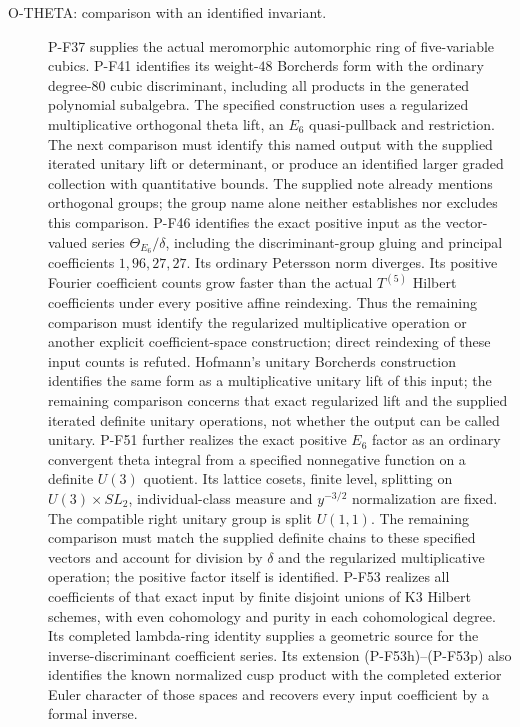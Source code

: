 \documentclass[11pt,a4paper]{article}
\begin{document}
\begin{description}
\item[O-THETA: comparison with an identified invariant.]
P-F37 supplies the actual meromorphic automorphic ring of
five-variable cubics. P-F41 identifies its weight-$48$
Borcherds form with the ordinary degree-$80$ cubic discriminant,
including all products in the generated polynomial subalgebra.
The specified construction uses a regularized multiplicative
orthogonal theta lift, an $E_6$ quasi-pullback and restriction.
The next comparison must identify this named output with the
supplied iterated unitary lift or determinant, or produce an
identified larger graded collection with quantitative bounds.
The supplied note already mentions orthogonal groups; the group
name alone neither establishes nor excludes this comparison.
P-F46 identifies the exact positive input as the vector-valued
series $\Theta_{E_6}/\delta$, including the discriminant-group
gluing and principal coefficients $1,96,27,27$. Its ordinary
Petersson norm diverges. Its positive Fourier coefficient counts
grow faster than the actual $T^{(5)}$ Hilbert coefficients under
every positive affine reindexing. Thus the remaining comparison
must identify the regularized multiplicative operation or another
explicit coefficient-space construction; direct reindexing of
these input counts is refuted. Hofmann's unitary Borcherds
construction identifies the same form as a multiplicative
unitary lift of this input; the remaining comparison concerns
that exact regularized lift and the supplied iterated definite
unitary operations, not whether the output can be called unitary.
P-F51 further realizes the exact positive $E_6$ factor as an
ordinary convergent theta integral from a specified nonnegative
function on a definite $U(3)$ quotient. Its lattice cosets,
finite level, splitting on $U(3)\times SL_2$, individual-class
measure and $y^{-3/2}$ normalization are fixed. The compatible
right unitary group is split $U(1,1)$. The remaining comparison
must match the supplied definite chains to these specified
vectors and account for division by $\delta$ and the regularized
multiplicative operation; the positive factor itself is identified.
P-F53 realizes all coefficients of that exact input by finite
disjoint unions of K3 Hilbert schemes, with even cohomology
and purity in each cohomological degree. Its completed
lambda-ring identity supplies a geometric source for the
inverse-discriminant coefficient series. Its extension
(P-F53h)--(P-F53p) also identifies the known normalized cusp
product with the completed exterior Euler character of those
spaces and recovers every input coefficient by a formal inverse.

\end{description}
\end{document}
